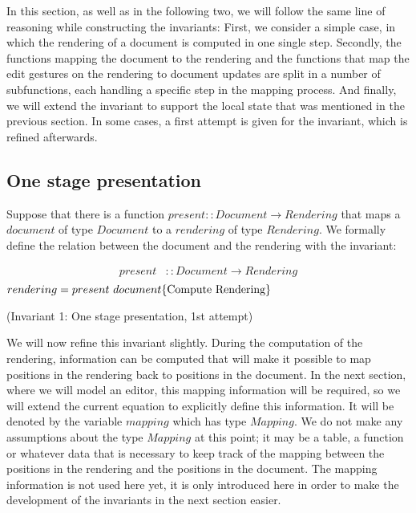 In this section, as well as in the following two, we will follow the same line of reasoning while constructing the invariants: First, we consider a simple case, in which the rendering of a document is computed in one single step. Secondly, the functions mapping the document to the rendering and the functions that map the edit gestures on the rendering to document updates are split in a number of subfunctions, each handling a specific step in the mapping process. And finally, we will extend the invariant to support the local state that was mentioned in the previous section. In some cases, a first attempt is given for the invariant, which is refined afterwards. 


\subsection{One stage presentation}


Suppose that there is a function $present :: Document \rightarrow Rendering$ that maps a $document$ of type $Document$ to a $rendering$ of type $Rendering$. We formally define the relation between the document and the rendering with the invariant:\begin{small}\begin{align*} %
present & :: Document \rightarrow Rendering \\
\end{align*}
\begin{math}
rendering = present~document
\hfill \text{\{Compute Rendering\}}
\end{math}\end{small}

{\centering (Invariant 1: One stage presentation, 1st attempt)\\}\vspace{1em}

We will now refine this invariant slightly. During the computation of the rendering, information can be computed that will make it possible to map positions in the rendering back to positions in the document. In the next section, where we will model an editor, this mapping information will be required, so we will extend the current equation to explicitly define this information. It will be denoted by the variable $mapping$ which has type $Mapping$. We do not make any assumptions about the type $Mapping$ at this point; it may be a table, a function or whatever data that is necessary to keep track of the mapping between the positions in the rendering and the positions in the document. The mapping information is not used here yet, it is only introduced here in order to make the development of the invariants in the next section easier. 

